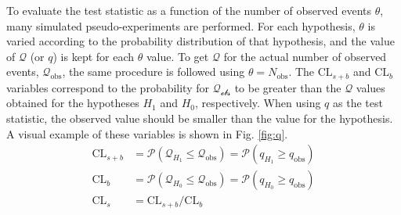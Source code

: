 To evaluate the test statistic as a function of the number of observed events $\theta$, many simulated pseudo-experiments are performed. For each hypothesis, $\theta$ is varied according to the probability distribution of that hypothesis, and the value of $\mathcal{Q}$ (or $q$) is kept for each $\theta$ value. To get $\mathcal{Q}$ for the actual number of observed events, $\mathcal{Q}_{\text{obs}}$, the same procedure is followed using $\theta=N_{\text{obs}}$. The $\text{CL}_{s+b}$ and $\text{CL}_{b}$ variables correspond to the probability for $\mathcal{Q_{\text{obs}}}$ to be greater than the $\mathcal{Q}$ values obtained for the hypotheses $H_1$ and $H_0$, respectively. When using $q$ as the test statistic, the observed value should be smaller than the value for the hypothesis. A visual example of these variables is shown in Fig. \ref{fig:q}.
\begin{align}
\text{CL}_{s+b} &= \mathcal{P}(\mathcal{Q}_{H_{1}} \leq \mathcal{Q}_{\text{obs}}) = \mathcal{P}(q_{H_{1}} \geq q_{\text{obs}}) \\
\text{CL}_{b} &= \mathcal{P}(\mathcal{Q}_{H_{0}} \leq \mathcal{Q}_{\text{obs}}) = \mathcal{P}(q_{H_{0}} \geq q_{\text{obs}}) \\
\text{CL}_{s} &= \text{CL}_{s+b}/\text{CL}_{b}
\end{align}

